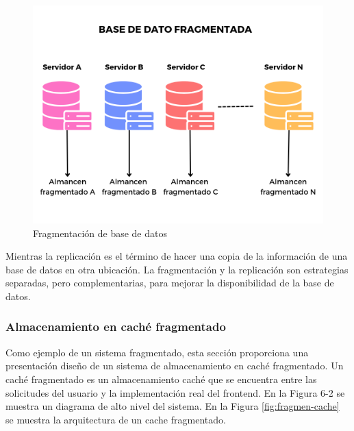  	\begin{figure}%
 	\includegraphics {9/6.png} 
 	\caption{Fragmentaci\'on de base de datos}
 	\label{fig:fragmen}
 \end{figure}
 
 Mientras la replicación  es el   término de  hacer una copia  de la información de una base de datos en otra ubicación. La fragmentación y la replicación son estrategias separadas, pero complementarias, para mejorar la disponibilidad de la base de datos.  
 
 \subsubsection{Almacenamiento en  caché fragmentado}
 
 Como ejemplo de  un sistema fragmentado, esta sección proporciona una presentaci\'on  diseño de un sistema de almacenamiento en caché fragmentado. Un caché fragmentado  \cite{Burns2018} es un almacenamiento  caché que se encuentra entre las solicitudes del usuario y la implementación real del frontend. En la Figura 6-2 se muestra un diagrama de alto nivel del sistema. En la Figura \ref{fig:fragmen-cache} se muestra la arquitectura de un cache fragmentado.
 
 
 
